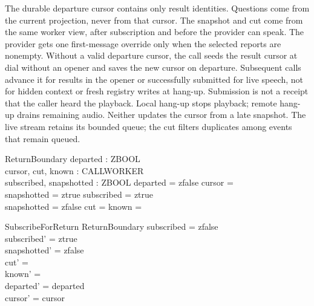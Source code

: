 \documentclass[a4paper,10pt,fleqn]{article}
\begin{document}
The durable departure cursor contains only result identities. Questions
come from the current projection, never from that cursor. The snapshot
and cut come from the same worker view, after subscription and before
the provider can speak. The provider gets one first-message override
only when the selected reports are nonempty.
Without a valid departure cursor, the call seeds the result cursor at dial
without an opener and saves the new cursor on departure. Subsequent
calls advance it for results in the opener or successfully submitted for
live speech, not for hidden context or fresh registry writes at hang-up.
Submission is not a receipt that the caller heard the playback.
Local hang-up stops playback; remote hang-up drains remaining audio.
Neither updates the cursor from a late snapshot. The live stream retains
its bounded queue; the cut filters duplicates among events that remain queued.

\begin{zed}
  [CALLWORKER]
\end{zed}

\begin{schema}{ReturnBoundary}
  departed : ZBOOL \\
  cursor, cut, known : CALLWORKER \pfun \nat \\
  subscribed, snapshotted : ZBOOL
\where
  departed = zfalse \implies cursor = \emptyset \\
  snapshotted = ztrue \implies subscribed = ztrue \\
  snapshotted = zfalse \implies cut = \emptyset \land known = \emptyset
\end{schema}

\begin{schema}{SubscribeForReturn}
  \Delta ReturnBoundary
\where
  subscribed = zfalse \\
  subscribed' = ztrue \\
  snapshotted' = zfalse \\
  cut' = \emptyset \\
  known' = \emptyset \\
  departed' = departed \\
  cursor' = cursor
\end{schema}
\end{document}
